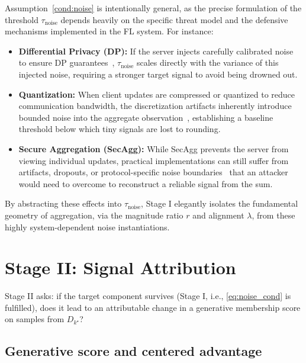 \documentclass[bdcc,article,submit,pdftex]{Definitions/mdpi}
\newcommand{\tindex}{k^\star}
\begin{document}
\begin{Remark}
Assumption~\ref{cond:noise} is intentionally general, as the precise formulation of the threshold $\tau_{\mathrm{noise}}$ depends heavily on the specific threat model and the defensive mechanisms implemented in the FL system. For instance:
\begin{itemize}[leftmargin=*]
    \item \textbf{Differential Privacy (DP):} If the server injects carefully calibrated noise to ensure DP guarantees~\cite{kim2022effects}, $\tau_{\mathrm{noise}}$ scales directly with the variance of this injected noise, requiring a stronger target signal to avoid being drowned out.
    \item \textbf{Quantization:} When client updates are compressed or quantized to reduce communication bandwidth, the discretization artifacts inherently introduce bounded noise into the aggregate observation~\cite{kang2024effect}, establishing a baseline threshold below which tiny signals are lost to rounding.
    \item \textbf{Secure Aggregation (SecAgg):} While SecAgg prevents the server from viewing individual updates, practical implementations can still suffer from artifacts, dropouts, or protocol-specific noise boundaries~\cite{gilbert2022secure} that an attacker would need to overcome to reconstruct a reliable signal from the sum.
\end{itemize}
By abstracting these effects into $\tau_{\mathrm{noise}}$, Stage I elegantly isolates the fundamental geometry of aggregation, via the magnitude ratio $r$ and alignment $\lambda$, from these highly system-dependent noise instantiations.
\end{Remark}

\section{Stage II: Signal Attribution}
\label{sec:stage2}

Stage II asks: if the target component survives (Stage I, i.e., \eqref{eq:noise_cond} is fulfilled), does it lead to an attributable change in a generative membership score on samples from $D_{\tindex}$?

\subsection{Generative score and centered advantage}
\end{document}
